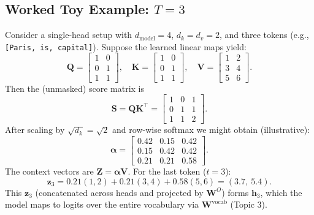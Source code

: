 \documentclass[11pt]{article}
\theoremstyle{remark}
\begin{document}
\subsection{Worked Toy Example: \texorpdfstring{\(T=3\)}{T=3}}
Consider a single-head setup with \(d_{\text{model}}=4\), \(d_k=d_v=2\), and three tokens (e.g., \texttt{[Paris, is, capital]}). Suppose the learned linear maps yield:
\[
\mathbf{Q}=
\begin{bmatrix}
1&0\\
0&1\\
1&1
\end{bmatrix},\quad
\mathbf{K}=
\begin{bmatrix}
1&0\\
0&1\\
1&1
\end{bmatrix},\quad
\mathbf{V}=
\begin{bmatrix}
1&2\\
3&4\\
5&6
\end{bmatrix}.
\]
Then the (unmasked) score matrix is
\[
\mathbf{S}=\mathbf{Q}\mathbf{K}^\top=
\begin{bmatrix}
1&0&1\\
0&1&1\\
1&1&2
\end{bmatrix}.
\]
After scaling by \(\sqrt{d_k}=\sqrt{2}\) and row-wise softmax we might obtain (illustrative):
\[
\boldsymbol{\alpha}=
\begin{bmatrix}
0.42 & 0.15 & 0.42\\
0.15 & 0.42 & 0.42\\
0.21 & 0.21 & 0.58
\end{bmatrix}.
\]
The context vectors are \(\mathbf{Z}=\boldsymbol{\alpha}\mathbf{V}\). For the last token (\(t=3\)):
\[
\mathbf{z}_3 = 0.21(1,2)+0.21(3,4)+0.58(5,6)=(3.7,\ 5.4).
\]
This \(\mathbf{z}_3\) (concatenated across heads and projected by \(\mathbf{W}^O\)) forms \(\mathbf{h}_3\), which the model maps to logits over the entire vocabulary via \(\mathbf{W}^{\text{vocab}}\) (Topic 3).
\end{document}
